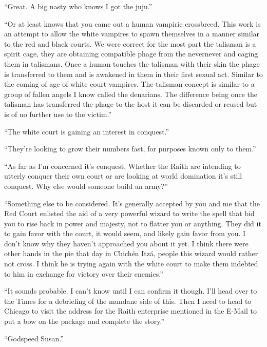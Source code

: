 ``Great. A big nasty who knows I got the juju.''

``Or at least knows that you came out a human vampiric crossbreed. This work is an attempt to allow the white vampires to spawn themselves in a manner similar to the red and black courts. We were correct for the most part the talisman is a spirit cage, they are obtaining compatible phage from the nevernever and caging them in talismans. Once a human touches the talisman with their skin the phage is transferred to them and is awakened in them in their first sexual act. Similar to the coming of age of white court vampires. The talisman concept is similar to a group of fallen angels I know called the denarians. The difference being once the talisman has transferred the phage to the host it can be discarded or reused but is of no further use to the victim.''

``The white court is gaining an interest in conquest.''

``They're looking to grow their numbers fast, for purposes known only to them.''

``As far as I'm concerned it's conquest. Whether the Raith are intending to utterly conquer their own court or are looking at world domination it's still conquest. Why else would someone build an army?''

``Something else to be considered. It's generally accepted by you and me that the Red Court enlisted the aid of a very powerful wizard to write the spell that bid you to rise back in power and majesty, not to flatter you or anything. They did it to gain favor with the court, it would seem, and likely gain favor from you. I don't know why they haven't approached you about it yet. I think there were other hands in the pie that day in Chich\'{e}n Itz\'{a}, people this wizard would rather not cross. I think he is trying again with the white court to make them indebted to him in exchange for victory over their enemies.''

``It sounds probable. I can't know until I can confirm it though. I'll head over to the Times for a debriefing of the mundane side of this. Then I need to head to Chicago to visit the address for the Raith enterprise mentioned in the E-Mail to put a bow on the package and complete the story.''

``Godspeed Susan.''

